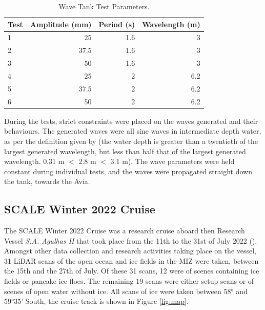 \begin{table}[H]
\centering
\caption{Wave Tank Test Parameters.}
\begin{tabular}{|l|r|r|r|}
\hline
\textbf{Test} & \multicolumn{1}{l|}{\textbf{Amplitude (mm)}} & \multicolumn{1}{l|}{\textbf{Period (s)}} & \multicolumn{1}{l|}{\textbf{Wavelength (m)}} \\ \hline
1 & 25   & 1.6 & 3   \\ \hline
2 & 37.5 & 1.6 & 3   \\ \hline
3 & 50   & 1.6 & 3   \\ \hline
4 & 25   & 2   & 6.2 \\ \hline
5 & 37.5 & 2   & 6.2 \\ \hline
6 & 50   & 2   & 6.2 \\ \hline
\end{tabular}
\label{tab:tank_tests}
\end{table}

During the tests, strict constraints were placed on the waves generated and their behaviours. The generated waves were all sine waves in intermediate depth water, as per the definition given by \textcite{benitzOceanHydrodynamicsEngineers} (the water depth is greater than a twentieth of the largest generated wavelength, but less than half that of the largest generated wavelength. 0.31 m $<$ 2.8 m $<$ 3.1 m). The wave parameters were held constant during individual tests, and the waves were propagated straight down the tank, towards the Avia. 

\subsection{SCALE Winter 2022 Cruise}
\label{subsec:ch4.section2.subsec2}

The \ac{SCALE} Winter 2022 Cruise was a research cruise aboard then Research Vessel \textit{S.A. Agulhas II} that took place from the 11th to the 31st of July 2022 (\cite{vichiSCALEWIN22CruiseReport2023}). Amongst other data collection and research activities taking place on the vessel, 31 \ac{LiDAR} scans of the open ocean and ice fields in the \ac{MIZ} were taken, between the 15th and the 27th of July. Of these 31 scans, 12 were of scenes containing ice fields or pancake ice floes. The remaining 19 scans were either setup scans or of scenes of open water without ice. All scans of ice were taken between 58° and 59°35' South, the cruise track is shown in Figure \ref{fig:map}.

